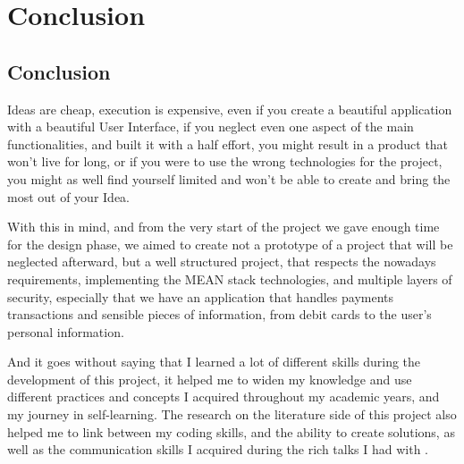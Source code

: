 \setcounter{mtc}{13}

\chapter*{Conclusion}
\label{chap:conclusion}
\minitoc
{}%
\section*{Conclusion}
Ideas are cheap, execution is expensive,
even if you create a beautiful application with
a beautiful User Interface, if you neglect even one aspect of the main functionalities,
and built it with a half effort, you might result in a product that won't live for long,
or if you were to use the wrong technologies for the project, you might as well find yourself
limited and won't be able to create and bring the most out of your Idea.

With this in mind, and from the very start of the project we gave enough time for the design phase,
we aimed to create not a prototype of a project that will be neglected afterward, but a well structured
project, that respects the nowadays requirements, implementing the MEAN stack technologies, and 
multiple layers of security, especially that we have an application that handles payments transactions
and sensible pieces of information, from debit cards to the user's personal information.

And it goes without saying that I learned a lot of different skills during the development of this project,
it helped me to widen my knowledge and use different practices and concepts I acquired throughout my academic
years, and my journey in self-learning. The research on the literature side of this project also helped me 
to link between my coding skills, and the ability to create solutions, as well as the communication skills
I acquired during the rich talks I had with \mentor.

